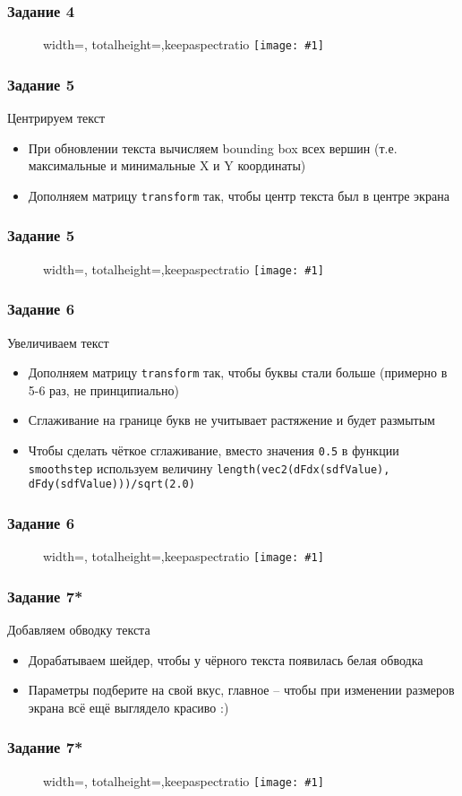 \documentclass{beamer}
\newcommand{\slideimage}[1]{
  \begin{figure}
    \begin{adjustbox}{width=\textwidth, totalheight=\textheight-2\baselineskip-2\baselineskip,keepaspectratio}
      \texttt{[image: \#1]}
    \end{adjustbox}
  \end{figure}
}
\begin{document}
\begin{frame}
\frametitle{Задание 4}
\slideimage{4.png}
\end{frame}

\begin{frame}[fragile]
\frametitle{Задание 5}
Центрируем текст
\begin{itemize}
\item При обновлении текста вычисляем bounding box всех вершин (т.е. максимальные и минимальные X и Y координаты)
\item Дополняем матрицу \verb|transform| так, чтобы центр текста был в центре экрана
\end{itemize}
\end{frame}

\begin{frame}
\frametitle{Задание 5}
\slideimage{5.png}
\end{frame}

\begin{frame}[fragile]
\frametitle{Задание 6}
Увеличиваем текст
\begin{itemize}
\item Дополняем матрицу \verb|transform| так, чтобы буквы стали больше (примерно в 5-6 раз, не принципиально)
\item Сглаживание на границе букв не учитывает растяжение и будет размытым
\item Чтобы сделать чёткое сглаживание, вместо значения \verb|0.5| в функции \verb|smoothstep| используем величину \verb|length(vec2(dFdx(sdfValue), dFdy(sdfValue)))/sqrt(2.0)|
\end{itemize}
\end{frame}

\begin{frame}
\frametitle{Задание 6}
\slideimage{6.png}
\end{frame}

\begin{frame}[fragile]
\frametitle{Задание 7*}
Добавляем обводку текста
\begin{itemize}
\item Дорабатываем шейдер, чтобы у чёрного текста появилась белая обводка
\item Параметры подберите на свой вкус, главное -- чтобы при изменении размеров экрана всё ещё выглядело красиво :)
\end{itemize}
\end{frame}

\begin{frame}
\frametitle{Задание 7*}
\slideimage{7.png}
\end{frame}
\end{document}

